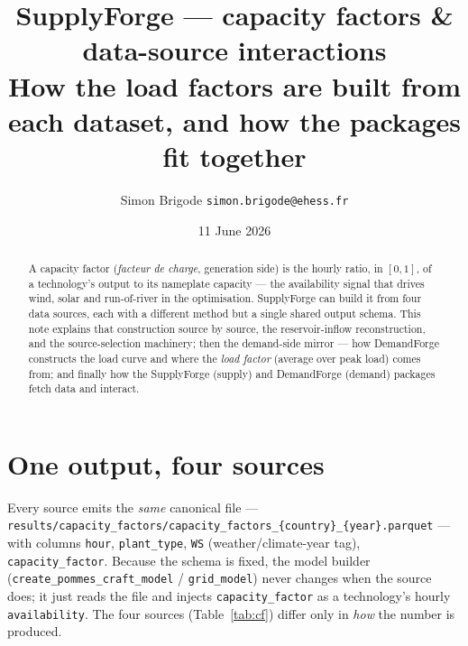 \documentclass[11pt,a4paper]{article}
\title{\textbf{SupplyForge --- capacity factors \& data-source interactions}\\[2pt]
\large How the load factors are built from each dataset, and how the packages fit together}
\author{Simon Brigode \quad\textendash\quad \texttt{simon.brigode@ehess.fr}}
\date{11 June 2026}
\begin{document}
\maketitle
\thispagestyle{fancy}

\begin{abstract}\noindent
A capacity factor (\emph{facteur de charge}, generation side) is the hourly ratio, in $[0,1]$, of a
technology's output to its nameplate capacity --- the availability signal that drives wind, solar and
run-of-river in the optimisation. SupplyForge can build it from four data sources, each with a different
method but a single shared output schema. This note explains that construction source by source, the
reservoir-inflow reconstruction, and the source-selection machinery; then the demand-side mirror --- how
DemandForge constructs the load curve and where the \emph{load factor} (average over peak load) comes
from; and finally how the SupplyForge (supply) and DemandForge (demand) packages fetch data and interact.
\end{abstract}

\tableofcontents
\bigskip

\section{One output, four sources}
Every source emits the \emph{same} canonical file --- \texttt{results/capacity\_factors/capacity\_factors\_\{country\}\_\{year\}.parquet}
--- with columns \texttt{hour}, \texttt{plant\_type}, \texttt{WS} (weather/climate-year tag),
\texttt{capacity\_factor}. Because the schema is fixed, the model builder
(\texttt{create\_pommes\_craft\_model} / \texttt{grid\_model}) never changes when the source does; it just
reads the file and injects \texttt{capacity\_factor} as a technology's hourly \texttt{availability}. The
four sources (Table~\ref{tab:cf}) differ only in \emph{how} the number is produced.
\end{document}
